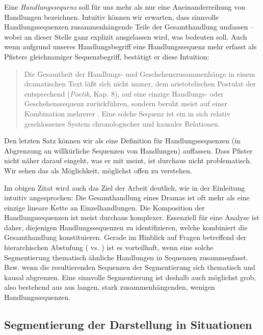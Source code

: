 \documentclass[a4paper,10pt,abstract=true,headings=small]{scrartcl}
\begin{document}
Eine \emph{Handlungssequenz} soll für uns mehr als nur eine Aneinanderreihung von Handlungen bezeichnen.
Intuitiv können wir erwarten, dass sinnvolle Handlungssequenzen zusammenhängende Teile der Gesamthandlung umfassen – wobei an dieser Stelle ganz explizit ausgelassen wird, was  bedeuten soll.
Auch wenn aufgrund unseres Handlungsbegriff eine Handlungssequenz mehr erfasst als Pfisters gleichnamiger Sequenzbegriff, bestätigt er diese Intuition: %
\blockcquote[Vgl.][285]{pfister_drama:_2001}{
    Die Gesamtheit der Handlungs- und Geschehenszusammenhänge  in 
    einem dramatischen Text läßt sich nicht immer, dem aristotelischen Postulat der  entsprechend (\emph{Poetik}, Kap. 8), auf eine einzige Handlungs- oder Geschehenssequenz  zurückführen, sondern beruht meist auf einer Kombination mehrerer . Eine solche Sequenz ist ein in sich relativ geschlossenes System 
chronologischer und kausaler Relationen.
}
Den letzten Satz können wir als eine Definition für Handlungssequenzen (in Abgrenzung an willkürliche Sequenzen von Handlungen) auffassen.
Dass Pfister nicht näher darauf eingeht, was er mit  meint, ist durchaus nicht problematisch.
Wir sehen das als Möglichkeit,  möglichst offen zu verstehen.

\label{page:plot-segmentierung}
Im obigen Zitat wird auch das Ziel der Arbeit deutlich, wie in der Einleitung intuitiv angesprochen:
Die Gesamthandlung eines Dramas ist oft mehr als eine einzige lineare Kette an Einzelhandlungen.
Die Komposition der Handlungssequenzen ist meist durchaus komplexer.
Essenziell für eine Analyse ist daher, diejenigen Handlungssequenzen zu identifizieren, welche kombiniert die Gesamthandlung konstituieren.
Gerade im Hinblick auf Fragen betreffend der hierarchischen Abstufung ( vs. ) ist es vorteilhaft, wenn eine solche Segmentierung thematisch ähnliche Handlungen in Sequenzen zusammenfasst.
Bzw. wenn die resultierenden Sequenzen der Segmentierung sich thematisch und kausal abgrenzen.
Eine sinnvolle Segmentierung ist deshalb auch möglichst grob, also bestehend aus aus langen, stark zusammenhängenden, wenigen Handlungssequenzen.

\subsection{Segmentierung der Darstellung in Situationen}\label{sec:situationen}
\end{document}
